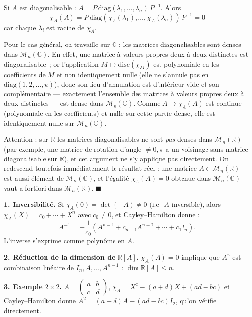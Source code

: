 \begin{mdframed}[style=proofbar]
  Si $A$ est diagonalisable : $A = P\,\mathrm{diag}(\lambda_1,\ldots,\lambda_n)\,P^{-1}$.
  Alors
  \[\chi_A(A) = P\,\mathrm{diag}(\chi_A(\lambda_1),\ldots,\chi_A(\lambda_n))\,P^{-1} = 0\]
  car chaque $\lambda_i$ est racine de $\chi_A$.

  Pour le cas général, on travaille sur $\mathbb{C}$ : les matrices
  diagonalisables sont denses dans $\mathcal{M}_n(\mathbb{C})$. En effet,
  une matrice à valeurs propres deux à deux distinctes est diagonalisable~;
  or l'application $M \mapsto \mathrm{disc}(\chi_M)$ est polynomiale en les
  coefficients de $M$ et non identiquement nulle (elle ne s'annule pas en
  $\mathrm{diag}(1,2,\ldots,n)$), donc son lieu d'annulation est d'intérieur
  vide et son complémentaire --- exactement l'ensemble des matrices à
  valeurs propres deux à deux distinctes --- est dense dans
  $\mathcal{M}_n(\mathbb{C})$. Comme $A\mapsto\chi_A(A)$ est continue (polynomiale en les
  coefficients) et nulle sur cette partie dense, elle est identiquement nulle
  sur $\mathcal{M}_n(\mathbb{C})$.

  \smallskip\noindent
  Attention : sur $\mathbb{R}$ les matrices diagonalisables ne sont
  \emph{pas} denses dans $\mathcal{M}_n(\mathbb{R})$ (par exemple, une matrice
  de rotation d'angle $\neq 0,\pi$ a un voisinage sans matrice diagonalisable
  sur $\mathbb{R}$), et cet argument ne s'y applique pas directement. On
  redescend toutefois immédiatement le résultat réel : une matrice
  $A\in\mathcal{M}_n(\mathbb{R})$ est aussi élément de $\mathcal{M}_n(\mathbb{C})$,
  et l'égalité $\chi_A(A)=0$ obtenue dans $\mathcal{M}_n(\mathbb{C})$ vaut
  a fortiori dans $\mathcal{M}_n(\mathbb{R})$.
  $\blacksquare$
\end{mdframed}

\decsep{}



\begin{mdframed}[style=exbar]
  \textbf{1. Inversibilité.}\enspace%
  Si $\chi_A(0) = \det(-A) \neq 0$ (i.e.\ $A$ inversible), alors
  $\chi_A(X) = c_0 + \cdots + X^n$ avec $c_0\neq 0$, et Cayley--Hamilton
  donne :
  \[
    A^{-1} = -\frac{1}{c_0}(A^{n-1}+c_{n-1}A^{n-2}+\cdots+c_1 I_n).
  \]
  L'inverse s'exprime comme polynôme en $A$.

  \smallskip\noindent
  \textbf{2. Réduction de la dimension de $\mathbb{R}[A]$.}\enspace%
  $\chi_A(A)=0$ implique que $A^n$ est combinaison linéaire de
  $I_n,A,\ldots,A^{n-1}$ : $\dim\mathbb{R}[A]\leq n$.

  \smallskip\noindent
  \textbf{3. Exemple $2\times 2$.}
  $A = \begin{pmatrix}a&b\\c&d\end{pmatrix}$,
  $\chi_A = X^2-(a+d)X+(ad-bc)$ et Cayley--Hamilton donne
  $A^2 = (a+d)A-(ad-bc)I_2$, qu'on vérifie directement.
\end{mdframed}

